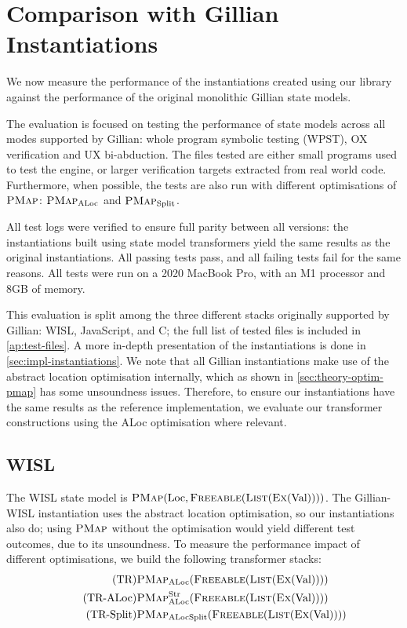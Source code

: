 \section{Comparison with Gillian Instantiations} \label{sec:comparison-gillian}

We now measure the performance of the instantiations created using our library against the performance of the original monolithic Gillian state models.

The evaluation is focused on testing the performance of state models across all modes supported by Gillian: whole program symbolic testing (WPST), OX verification and UX bi-abduction. The files tested are either small programs used to test the engine, or larger verification targets extracted from real world code. Furthermore, when possible, the tests are also run with different optimisations of $\textsc{PMap}$: $\textsc{PMap}_{\text{ALoc}}$ and $\textsc{PMap}_{\text{Split}}$.

All test logs were verified to ensure full parity between all versions: the instantiations built using state model transformers yield the same results as the original instantiations. All passing tests pass, and all failing tests fail for the same reasons. All tests were run on a 2020 MacBook Pro, with an M1 processor and 8GB of memory.

This evaluation is split among the three different stacks originally supported by Gillian: WISL, JavaScript, and C; the full list of tested files is included in \cref{ap:test-files}. A more in-depth presentation of the instantiations is done in \cref{sec:impl-instantiations}. We note that all Gillian instantiations make use of the abstract location optimisation internally, which as shown in \cref{sec:theory-optim-pmap} has some unsoundness issues. Therefore, to ensure our instantiations have the same results as the reference implementation, we evaluate our transformer constructions using the ALoc optimisation where relevant.

\subsection{WISL}

The WISL state model is $\textsc{PMap}(\text{Loc}, \textsc{Freeable}(\textsc{List}(\textsc{Ex}(\text{Val}))))$. The Gillian-WISL instantiation uses the abstract location optimisation, so our instantiations also do; using $\textsc{PMap}$ without the optimisation would yield different test outcomes, due to its unsoundness. To measure the performance impact of different optimisations, we build the following transformer stacks: \begin{align}
\tag{TR}       & \textsc{PMap}_{\text{ALoc}}(\textsc{Freeable}(\textsc{List}(\textsc{Ex}(\text{Val})))) \\
\tag{TR-ALoc}  & \textsc{PMap}_{\text{ALoc}}^{\text{Str}}(\textsc{Freeable}(\textsc{List}(\textsc{Ex}(\text{Val})))) \\
\tag{TR-Split} & \textsc{PMap}_{\text{ALocSplit}}(\textsc{Freeable}(\textsc{List}(\textsc{Ex}(\text{Val}))))
\end{align}

